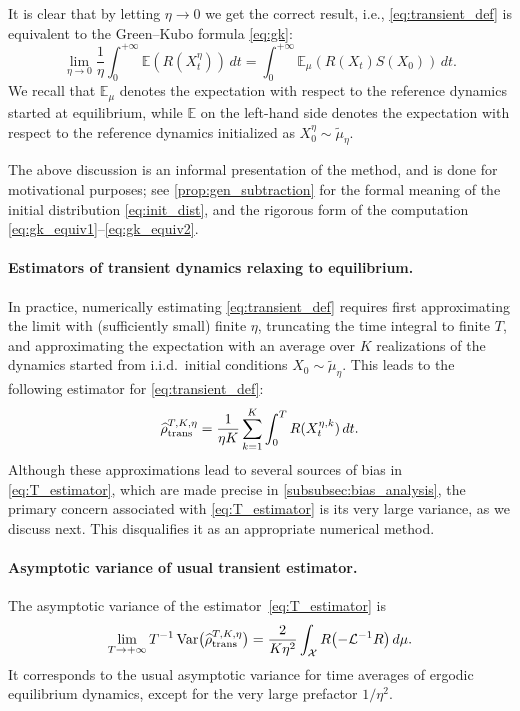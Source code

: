 \documentclass[11pt]{article}
\newcommand{\E}{\mathbb{E}}
\renewcommand{\L}{\mathcal{L}}
\DeclareMathOperator{\Var}{Var}
\DeclarePairedDelimiter\paren{\lparen}{\rparen}
\theoremstyle{definition}
\let\oldparagraph=\paragraph
\renewcommand\paragraph[1]{\oldparagraph{#1.}}
\newcommand{\psip}{\widetilde{\mu}_\eta}
\newcommand{\estTmp}{\widehat{\rho}}
\newcommand{\Test}{\estTmp^{T,K,\eta}_{\rm trans}} %
\begin{document}
It is clear that by letting $\eta\to 0$ we get the correct result, i.e., \eqref{eq:transient_def} is equivalent to the Green--Kubo formula \eqref{eq:gk}:
\begin{equation}
	\lim_{\eta\to 0}\frac{1}{\eta}\int_0^{+\infty} \E(R(X_t^\eta)) \, dt = \int_0^{+\infty} \E_\mu(R(X_t) S(X_0)) \, dt.
	\label{eq:td_gk}
\end{equation}
We recall that $\E_\mu$ denotes the expectation with respect to the reference dynamics started at equilibrium, while $\E$ on the left-hand side denotes the expectation with respect to the reference dynamics initialized as $X_0^\eta \sim \psip$.

The above discussion is an informal presentation of the method, and is done for motivational purposes; see \cref{prop:gen_subtraction} for the formal meaning of the initial distribution \eqref{eq:init_dist}, and the rigorous form of the computation \eqref{eq:gk_equiv1}--\eqref{eq:gk_equiv2}.  

\paragraph{Estimators of transient dynamics relaxing to equilibrium} In practice, numerically estimating \eqref{eq:transient_def} requires first approximating the limit with (sufficiently small) finite $\eta$, truncating the time integral to finite $T$, and approximating the expectation with an average over $K$ realizations of the dynamics started from i.i.d.\ initial conditions $X_0\sim\psip$. This leads to the following estimator for \eqref{eq:transient_def}:
\begin{equation}
	\Test = \frac{1}{\eta K}\sum_{k=1}^K \int_0^T R(X_t^{\eta,k}) \, dt.	
	\label{eq:T_estimator}
\end{equation}
Although these approximations lead to several sources of bias in \eqref{eq:T_estimator}, which are made precise in \cref{subsubsec:bias_analysis}, the primary concern associated with \eqref{eq:T_estimator} is its very large variance, as we discuss next. This disqualifies it as an appropriate numerical method.

\paragraph{Asymptotic variance of usual transient estimator} The asymptotic variance of the estimator~\eqref{eq:T_estimator} is
\begin{equation}
	\lim_{T\to+\infty} T^{-1}\Var\bigl(\Test\bigr) = \frac{2}{K\eta^2}\int_\mathcal{X} R\paren*{-\L^{-1} R} \, d\mu.
	\label{eq:asym_var_transient}
\end{equation}
It corresponds to the usual asymptotic variance for time averages of ergodic equilibrium dynamics, except for the very large prefactor $1/\eta^2$. 
\end{document}
